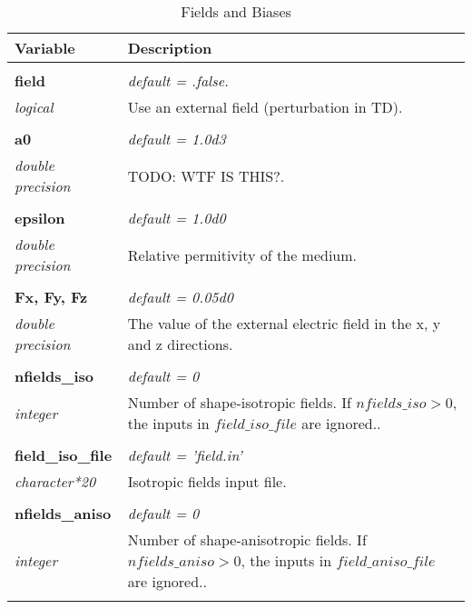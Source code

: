 \begin{Spacing}{1.0}
\begin{longtable}{ p{} p{} }

   \toprule
   \textbf{Variable} & Description \\*
   \midrule \\*
   \endhead

   \bottomrule
   \caption{Fields and Biases}
   \endfoot

   \textbf{field}
   &  \textit{default = .false. }
   \\*\textit{logical}
   & Use an external field (perturbation in TD).\\* \\

   \textbf{a0}
   &  \textit{default = 1.0d3}
   \\*\textit{double precision}
   & TODO: WTF IS THIS?.\\* \\

   \textbf{epsilon}
   &  \textit{default = 1.0d0}
   \\*\textit{double precision}
   & Relative permitivity of the medium.\\* \\

   \textbf{Fx, Fy, Fz}
   &  \textit{default = 0.05d0}
   \\*\textit{double precision}
   & The value of the external electric field in the
   x, y and z directions.\\* \\

   \textbf{nfields\_iso}
   &  \textit{default = 0}
   \\*\textit{integer}
   & Number of shape-isotropic fields. If $nfields\_iso > 0$,
   the inputs in $field\_iso\_file$ are ignored..\\* \\

   \textbf{field\_iso\_file}
   &  \textit{default = 'field.in'}
   \\*\textit{character*20}
   & Isotropic fields input file.\\* \\

   \textbf{nfields\_aniso}
   &  \textit{default = 0}
   \\*\textit{integer}
   & Number of shape-anisotropic fields. If $nfields\_aniso > 0$, 
   the inputs in $field\_aniso\_file$ are ignored..\\* \\


\end{longtable}
\end{Spacing}
